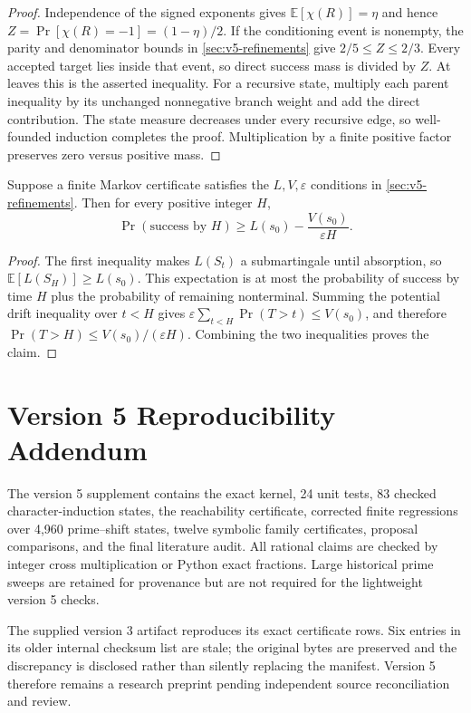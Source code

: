 \begin{proof}
Independence of the signed exponents gives
$\mathbb E[\chi(R)]=\eta$ and hence
$Z=\Pr[\chi(R)=-1]=(1-\eta)/2$.  If the conditioning event is nonempty,
the parity and denominator bounds in \cref{sec:v5-refinements} give
$2/5\le Z\le2/3$.  Every accepted target lies inside that event, so direct
success mass is divided by $Z$.  At leaves this is the asserted inequality.
For a recursive state, multiply each parent inequality by its unchanged
nonnegative branch weight and add the direct contribution.  The state measure
decreases under every recursive edge, so well-founded induction completes the
proof.  Multiplication by a finite positive factor preserves zero versus
positive mass.
\end{proof}

\begin{theorem}
Suppose a finite Markov certificate satisfies the $L,V,\varepsilon$
conditions in \cref{sec:v5-refinements}.  Then for every positive integer
$H$,
\[
  \Pr(\text{success by }H)
  \ge L(s_0)-\frac{V(s_0)}{\varepsilon H}.
\]
\end{theorem}

\begin{proof}
The first inequality makes $L(S_t)$ a submartingale until absorption, so
$\mathbb E[L(S_H)]\ge L(s_0)$.  This expectation is at most the probability
of success by time $H$ plus the probability of remaining nonterminal.  Summing
the potential drift inequality over $t<H$ gives
$\varepsilon\sum_{t<H}\Pr(T>t)\le V(s_0)$, and therefore
$\Pr(T>H)\le V(s_0)/(\varepsilon H)$.  Combining the two inequalities proves
the claim.
\end{proof}

\section{Version 5 Reproducibility Addendum}

The version 5 supplement contains the exact kernel, 24 unit tests, 83 checked
character-induction states, the reachability certificate, corrected finite
regressions over 4,960 prime--shift states, twelve symbolic family
certificates, proposal comparisons, and the final literature audit.  All
rational claims are checked by integer cross multiplication or Python exact
fractions.  Large historical prime sweeps are retained for provenance but are
not required for the lightweight version 5 checks.

The supplied version 3 artifact reproduces its exact certificate rows.  Six
entries in its older internal checksum list are stale; the original bytes are
preserved and the discrepancy is disclosed rather than silently replacing the
manifest.  Version 5 therefore remains a research preprint pending independent
source reconciliation and review.

